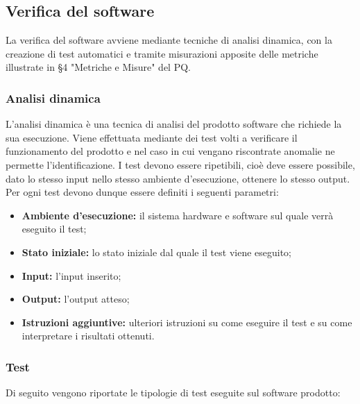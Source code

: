 \documentclass[../NormediProgetto.tex]{subfiles}
\begin{document}
\subsection{Verifica del software}

La verifica del software avviene mediante tecniche di analisi dinamica, con la creazione di test automatici e tramite misurazioni apposite delle metriche illustrate in §4 "Metriche e Misure" del PQ.

\subsubsection{Analisi dinamica}

L’analisi dinamica è una tecnica di analisi del prodotto software che richiede la sua esecuzione. Viene effettuata mediante dei test volti a verificare il funzionamento del prodotto e nel caso in cui vengano riscontrate anomalie ne permette l’identificazione. I test devono essere ripetibili, cioè deve essere possibile, dato lo stesso input nello stesso ambiente d'esecuzione, ottenere lo stesso output. Per ogni test devono dunque essere definiti i seguenti parametri:

\begin{itemize}
    \item \textbf{Ambiente d'esecuzione:} il sistema hardware e software sul quale verrà eseguito il test;
    \item \textbf{Stato iniziale:} lo stato iniziale dal quale il test viene eseguito;
    \item \textbf{Input:} l’input inserito;
    \item \textbf{Output:} l’output atteso;
    \item \textbf{Istruzioni aggiuntive:} ulteriori istruzioni su come eseguire il test e su come interpretare i risultati ottenuti.
\end{itemize}

\subsubsection{Test}

Di seguito vengono riportate le tipologie di test eseguite sul software prodotto:
\end{document}
